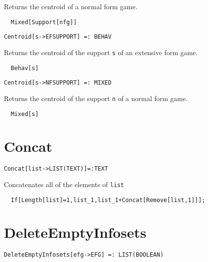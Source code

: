 \noindent
Returns the centroid of a normal form game.  

\udfbody
\begin{verbatim}
  Mixed[Support[nfg]]
\end{verbatim} 

\newsignature

\begin{verbatim}
Centroid[s->EFSUPPORT] =: BEHAV 
\end{verbatim}

\noindent
Returns the centroid of the support \verb+s+ of an extensive form game.  

\udfbody
\begin{verbatim}
  Behav[s]
\end{verbatim} 

\newsignature

\begin{verbatim}
Centroid[s->NFSUPPORT] =: MIXED 
\end{verbatim}

\noindent
Returns the centroid of the support \verb+n+ of a normal form game.  

\udfbody
\begin{verbatim}
  Mixed[s]
\end{verbatim} 


\section*{Concat}\label{ExtConcat}
\begin{verbatim}
Concat[list->LIST(TEXT)]=:TEXT
\end{verbatim}

\noindent
Concatenates all of the elements of \verb+list+

\udfbody
\begin{verbatim}
  If[Length[list]=1,list_1,list_1+Concat[Remove[list,1]]];
\end{verbatim} 



\section*{DeleteEmptyInfosets}\label{ExtDeleteEmptyInfosets}
\begin{verbatim}
DeleteEmptyInfosets[efg->EFG] =: LIST(BOOLEAN) 
\end{verbatim}


